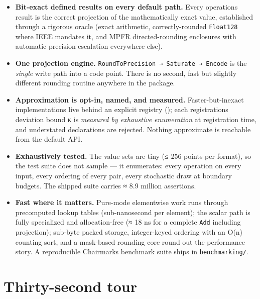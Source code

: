 \begin{itemize}
\item \textbf{Bit-exact defined results on every default path.} Every operation{\textquotesingle}s result is the correct projection of the mathematically exact value, established through a rigorous oracle (exact arithmetic, correctly-rounded \texttt{Float128} where IEEE mandates it, and MPFR directed-rounding enclosures with automatic precision escalation everywhere else).


\item \textbf{One projection engine.} \texttt{RoundToPrecision → Saturate → Encode} is the \emph{single} write path into a code point. There is no second, {\textquotedbl}fast but slightly different{\textquotedbl} rounding routine anywhere in the package.


\item \textbf{Approximation is opt-in, named, and measured.} Faster-but-inexact implementations live behind an explicit registry (); each registration{\textquotesingle}s deviation bound κ is \emph{measured by exhaustive enumeration} at registration time, and understated declarations are rejected. Nothing approximate is reachable from the default API.


\item \textbf{Exhaustively tested.} The value sets are tiny (≤ 256 points per format), so the test suite does not sample — it enumerates: every operation on every input, every ordering of every pair, every stochastic draw at boundary budgets. The shipped suite carries ≈ 8.9 million assertions.


\item \textbf{Fast where it matters.} Pure-mode elementwise work runs through precomputed lookup tables (sub-nanosecond per element); the scalar path is fully specialized and allocation-free (≈ 18 ns for a complete \texttt{Add} including projection); sub-byte packed storage, integer-keyed ordering with an O(n) counting sort, and a mask-based rounding core round out the performance story. A reproducible Chairmarks benchmark suite ships in \texttt{benchmarking/}.

\end{itemize}


\section{Thirty-second tour}



